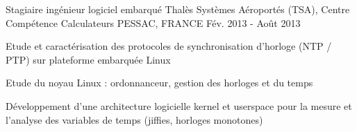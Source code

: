 \begin{cventries}

  \cventry
    {Stagiaire ingénieur logiciel embarqué} %
    {Thalès Systèmes Aéroportés (TSA), Centre Compétence Calculateurs} %
    {PESSAC, FRANCE} %
    {Fév. 2013 - Août 2013} %
    {
      \begin{cvitems} %
      \item {Etude et caractérisation des protocoles de synchronisation d'horloge (NTP / PTP) sur plateforme embarquée Linux}
        \item {Etude du noyau Linux : ordonnanceur, gestion des horloges et du temps}
        \item {Développement d'une architecture logicielle kernel et userspace pour la mesure et l'analyse des variables de temps (jiffies, horloges monotones)}
      \end{cvitems}
    }


\end{cventries}
